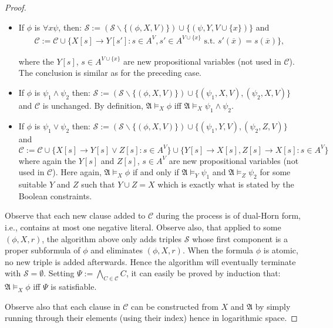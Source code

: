 \documentclass{article}
\theoremstyle{plain}
\theoremstyle{definition}
\newcommand{\mA}{{\mathfrak A}}
\newcommand{\restrict}[2]{{#1}({#2})}
\newcommand{\calC}{{\mathcal C}}
\newcommand{\calS}{{\mathcal S}}
\newcommand{\tu}[1]{\overline{#1}}
\begin{document}
\begin{proof}
\begin{itemize}
  	
  	\item If $\phi$ is   $\forall x \psi$, then: $\calS := ( \calS \backslash \{(\phi,X,V)\} ) \cup \{(\psi,Y, V\cup\{x\})\} $ and 
  	  		\[
 \begin{array}{l}
\calC :=  \calC \cup  \{X[s]\rightarrow Y[s']:  s\in A^V, s'\in A^{V\cup\{x\}} \mbox{ s.t. } \restrict{s'}{\tu x}=\restrict{s}{\tu x} \},  
 \end{array}
  	  	\]


  	  	 \noindent where the $Y[s]$, $s\in A^{V\cup\{x\}}$ are new  propositional variables (not used in $\calC$). The conclusion is similar as for the preceding case.
  	  	 
  	\item  If $\phi$ is   $\psi_1 \wedge \psi_2$ then: $\calS := ( \calS \backslash \{(\phi,X,V)\} ) \cup \{(\psi_1,X, V), (\psi_2,X, V)\}$
  	and $\calC$ is unchanged. By definition, $\mA\models_X\phi$ iff $\mA\models_X\psi_1 \wedge \psi_2$.
  	 \item 	If $\phi$ is   $\psi_1 \vee \psi_2$ then: $\calS := ( \calS \backslash \{(\phi,X,V)\} ) \cup \{(\psi_1,Y, V), (\psi_2,Z, V)\} $ and
$$\textstyle
\calC :=  \calC \cup 
 \{X[s]\rightarrow Y[s]\vee Z[s]: s\in A^V \}\cup 
 \{Y[s]\rightarrow X[s],  Z[s]\rightarrow X[s]: s\in A^V \} 
$$
\noindent where again the $Y[s]$ and $Z[s]$, $s\in A^{V}$ are  new propositional variables  (not used in $\calC$). Here again, $\mA\models_X\phi$ if and only if $\mA\models_Y\psi_1$ and $\mA\models_Z\psi_2$ for some suitable $Y$ and $Z$ such that $Y\cup Z=X$ which is exactly what is stated by the Boolean constraints.
  \end{itemize}
  
  Observe that each new clause added to $\calC$ during the process is of dual-Horn form, i.e., contains at most one negative literal. Observe also, that applied to some $(\phi,X,r)$, the algorithm above only adds triples  $\calS$ whose first component is a proper subformula of $\phi$ and eliminates  $(\phi,X,r)$. When the formula $\phi$ is atomic, no new triple is added afterwards.  Hence the algorithm will eventually terminate with $\calS=\emptyset$. 
 Setting $\Psi:= \bigwedge_{C\in\calC} C$, it can easily be proved by induction that: $\mA \models_X \phi$  iff  $\Psi$ is satisfiable.  
 
  



Observe also that each clause in $\calC$ can be constructed from $X$ and $\mA$ by simply running through their elements (using their index) hence  in logarithmic space. 
  \end{proof}
  
\end{document}
